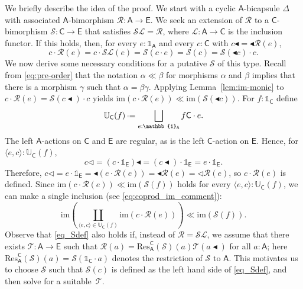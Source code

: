 \documentclass{amsart}
\newcommand{\Cat}[1]{\mathsf{#1}}
\newcommand{\cat}[1]{\Cat{#1}}
\newcommand{\acat}[1]{\mathsf{#1}}
\numberwithin{lstfloat}{section}
\newcommand{\srcfunc}{\mathbin{\blacktriangleleft}}
\newcommand{\tgtfunc}{\mathbin{\blacktriangleleft}}
\newcommand{\src}[1]{#1\srcfunc}
\newcommand{\tgt}[1]{\tgtfunc #1}
\newcommand{\one}{\mathbb{1}}
\newcommand{\defeq}{\mathrel{\hstretch{.13}{=}\hspace{.2ex}{=}}}
\newcommand{\func}[1]{\mathcal{#1}}
\newcommand{\fR}{\func{R}}
\newcommand{\cA}{\cat{A}}
\newcommand{\cE}{\cat{E}}
\theoremstyle{definition}
\theoremstyle{remark}
\numberwithin{equation}{section}
\begin{document}
We briefly describe the idea of the proof. We start with a cyclic
$\cA$-bicapsule $\Delta$ with associated $\acat{A}$-bimorphism $\fR:\cA\to \cE$.
We seek an extension of $\func{R}$ to a $\acat{C}$-bimorphism $\func{S}\colon
\cat{C}\to \cat{E}$ that
satisfies $\func{S}\func{L}=\func{R}$, where
$\func{L}\colon \acat{A}\to\acat{C}$ is the inclusion functor. If this holds,
then, for every $e:\one_{\acat{A}}$ and every $c:\acat{C}$ with
$\src{c}=\tgt{\func{R}(e)}$,
\[c\cdot\func{R}(e)= c\cdot \func{S}\func{L}(e)=\func{S}(c\cdot
e)=\func{S}(c)=\func{S}(\tgt{c})\cdot c.\]
We now derive some necessary conditions for a putative $\func{S}$ of this type. Recall from \eqref{eq:pre-order} that
the notation $\alpha\ll \beta$ for morphisms $\alpha$ and $\beta$ implies that
there is a morphism $\gamma$ such that $\alpha=\beta\gamma$. Applying
Lemma~\ref{lem:im-monic} to $c\cdot \func{R}(e)=\func{S}(\src{c})\cdot c$ yields
$\mathrm{im}(c\cdot \func{R}(e))\ll \mathrm{im}(\func{S}(\tgt{c}))$. 
For $f:\one_{\acat{C}}$ define
\begin{align*}
\mathbb{U}_{\acat{C}}(f)
\defeq \bigsqcup_{e:\one_{\acat{A}}}f\acat{C}\cdot e.
\end{align*} 
The
  left $\acat{A}$-actions on $\acat{C}$ and $\acat{E}$ are regular, as is
  the left $\acat{C}$-action on $\acat{E}$. 
Hence, for $\langle e,c\rangle:\mathbb{U}_{\acat{C}}(f)$, 
  \[ 
    c\lhd = \src{(c\cdot \one_{\acat{E}})} = (\src{c})\cdot \one_{\acat{E}} = e\cdot \one_{\acat{E}}.
  \]
  Therefore, $c\lhd = e\cdot \one_{\acat{E}} = \tgt{(e\cdot \fR(e))} =
  \tgt{\fR(e)} = \lhd \fR(e)$, so $c\cdot \fR(e)$ is defined. Since
  $\mathrm{im}(c\cdot \func{R}(e))\ll \mathrm{im}(\func{S}(f))$ holds for every
  $\langle e,c\rangle:\mathbb{U}_{\acat{C}}(f)$, we can make a single inclusion (see \eqref{eq:coprod_im_comment}):
\begin{equation}\label{eq_Sdef}
  \mathrm{im}\left(\coprod_{{\langle e,c\rangle \in \mathbb{U}_{\acat{C}}(f)}} \mathrm{im}(c\cdot \func{R}(e))\right) \ll \mathrm{im}(\func{S}(f)).
\end{equation} 
Observe that \eqref{eq_Sdef} also holds if, instead of $\func{R}=\func{SL}$,
we assume that there exists $\func{T}:\acat{A}\to\acat{E}$ such that
$\func{R}(a)=\mathrm{Res}_{\acat{A}}^{\acat{C}}(\func{S})(a)\func{T}(\src{a})$
for all $a:\acat{A}$; here $\mathrm{Res}_{\acat{A}}^{\acat{C}}(\func{S})(a)=\func{S}(\one_{\acat{C}}\cdot a)$ denotes the restriction of $\func{S}$ to $\acat{A}$. This motivates us to choose $\func{S}$ such that
$\func{S}(c)$ is defined as the left hand side of \eqref{eq_Sdef}, and then solve
for a suitable~$\func{T}$.   
\end{document}

